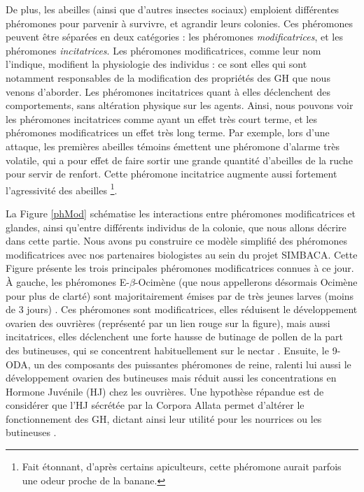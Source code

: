 			De plus, les abeilles (ainsi que d'autres insectes sociaux) emploient différentes phéromones pour parvenir à survivre, et agrandir leurs colonies. Ces phéromones peuvent être séparées en deux catégories : les phéromones \textit{modificatrices}, et les phéromones \textit{incitatrices}. Les phéromones modificatrices, comme leur nom l'indique, modifient la physiologie des individus : ce sont elles qui sont notamment responsables de la modification des propriétés des GH que nous venons d'aborder. Les phéromones incitatrices quant à elles déclenchent des comportements, sans altération physique sur les agents. Ainsi, nous pouvons voir les phéromones incitatrices comme ayant un effet très court terme, et les phéromones modificatrices un effet très long terme. Par exemple, lors d'une attaque, les premières abeilles témoins émettent une phéromone d'alarme très volatile, qui a pour effet de faire sortir une grande quantité d'abeilles de la ruche pour servir de renfort. Cette phéromone incitatrice augmente aussi fortement l'agressivité des abeilles \footnote{Fait étonnant, d'après certains apiculteurs, cette phéromone aurait parfois une odeur proche de la banane.}.
			
			La Figure \ref{phMod} schématise les interactions entre phéromones modificatrices et glandes, ainsi qu'entre différents individus de la colonie, que nous allons décrire dans cette partie. Nous avons pu construire ce modèle simplifié des phéromones modificatrices avec nos partenaires biologistes au sein du projet SIMBACA. Cette Figure présente les trois principales phéromones modificatrices connues à ce jour. À gauche, les phéromones E-$\beta$-Ocimène (que nous appellerons désormais Ocimène pour plus de clarté) sont majoritairement émises par de très jeunes larves (moins de 3 jours) \cite{maisonnasse_e-b-ocimene_2010}. Ces phéromones sont modificatrices, elles réduisent le développement ovarien des ouvrières (représenté par un lien rouge sur la figure), mais aussi incitatrices, elles déclenchent une forte hausse de butinage de pollen de la part des butineuses, qui se concentrent habituellement sur le nectar \cite{maisonnasse_e-b-ocimene_2010}. Ensuite, le 9-ODA, un des composants des puissantes phéromones de reine, ralenti lui aussi le développement ovarien des butineuses mais réduit aussi les concentrations en Hormone Juvénile (HJ) chez les ouvrières. Une hypothèse répandue est de considérer que l'HJ sécrétée par la Corpora Allata permet d'altérer le fonctionnement des GH, dictant ainsi leur utilité pour les nourrices ou les butineuses \cite{robinson_colony_1998}.
			 
